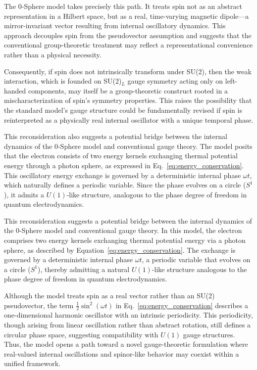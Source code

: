 \documentclass[12pt,letterpaper]{article} %
\begin{document}
The 0-Sphere model takes precisely this path. It treats spin not as an abstract representation in a Hilbert space, but as a real, time-varying magnetic dipole—a mirror-invariant vector resulting from internal oscillatory dynamics. This approach decouples spin from the pseudovector assumption and suggests that the conventional group-theoretic treatment may reflect a representational convenience rather than a physical necessity.

Consequently, if spin does not intrinsically transform under SU(2), then the weak interaction, which is founded on SU(2)$_L$ gauge symmetry acting only on left-handed components, may itself be a group-theoretic construct rooted in a mischaracterization of spin's symmetry properties. This raises the possibility that the standard model’s gauge structure could be fundamentally revised if spin is reinterpreted as a physically real internal oscillator with a unique temporal phase.

This reconsideration also suggests a potential bridge between the internal dynamics of the 0-Sphere model and conventional gauge theory. The model posits that the electron consists of two energy kernels exchanging thermal potential energy through a photon sphere, as expressed in Eq.~\eqref{eq:energy_conservation}. This oscillatory energy exchange is governed by a deterministic internal phase $\omega t$, which naturally defines a periodic variable. Since the phase evolves on a circle ($S^1$), it admits a $U(1)$-like structure, analogous to the phase degree of freedom in quantum electrodynamics.

This reconsideration suggests a potential bridge between the internal dynamics of the 0-Sphere model and conventional gauge theory. In this model, the electron comprises two energy kernels exchanging thermal potential energy via a photon sphere, as described by Equation~\eqref{eq:energy_conservation}. The exchange is governed by a deterministic internal phase $\omega t$, a periodic variable that evolves on a circle ($S^1$), thereby admitting a natural $U(1)$-like structure analogous to the phase degree of freedom in quantum electrodynamics.

Although the model treats spin as a real vector rather than an SU(2) pseudovector, the term $\frac{1}{2}\sin^2(\omega t)$ in Eq.~\eqref{eq:energy_conservation} describes a one-dimensional harmonic oscillator with an intrinsic periodicity. This periodicity, though arising from linear oscillation rather than abstract rotation, still defines a circular phase space, suggesting compatibility with $U(1)$ gauge structures. Thus, the model opens a path toward a novel gauge-theoretic formulation where real-valued internal oscillations and spinor-like behavior may coexist within a unified framework.
\end{document}

